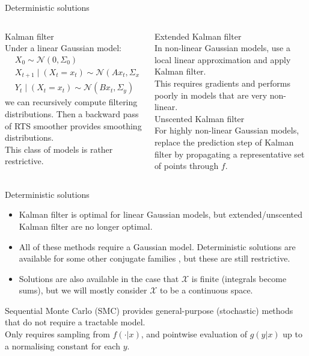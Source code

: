 \documentclass[aspectratio=169]{beamer}
\theoremstyle{definition}
\newcommand{\N}{\mathcal{N}}
\begin{document}
\begin{frame}{Deterministic solutions}
\begin{columns}
\begin{column}{0.45\textwidth}
{\Large Kalman filter \cite{kalman1960}}\\
Under a linear Gaussian model:
\begin{align*}
& X_0 \sim \N(0, \Sigma_0) \\
& X_{t+1} \mid (X_t = x_t) \sim \N(A x_t, \Sigma_x) \\
& Y_t \mid (X_t = x_t) \sim \N(B x_t, \Sigma_y)
\end{align*}
we can recursively compute filtering distributions. 
Then a backward pass of RTS smoother \cite{rauch1965} provides smoothing distributions.\\[7pt]
This class of models is rather restrictive.
\end{column}
\pause
\begin{column}{0.45\textwidth}
{\Large Extended Kalman filter \cite{jazwinski2007}}\\
In non-linear Gaussian models, use a local linear approximation and apply Kalman filter.\\[7pt]
This requires gradients and performs poorly in models that are very non-linear.\\[12pt]
\pause
{\Large Unscented Kalman filter \cite{wan2000}}\\
For highly non-linear Gaussian models, replace the prediction step of Kalman filter by propagating a representative set of points through $f$.
\end{column}
\end{columns}
\end{frame}

\begin{frame}{Deterministic solutions}
\begin{itemize}
\item Kalman filter is optimal for linear Gaussian models, but extended/unscented Kalman filter are no longer optimal.\\[7pt] %
\pause
\item All of these methods require a Gaussian model.
Deterministic solutions are available for some other conjugate families \cite{vidoni1999}, but these are still restrictive. \\[7pt]
\pause
\item Solutions are also available in the case that $\mathcal{X}$ is finite (integrals become sums), but we will mostly consider $\mathcal{X}$ to be a continuous space. \\[7pt]
\end{itemize}
\pause
Sequential Monte Carlo (SMC) provides general-purpose (stochastic) methods that do not require a tractable model.\\[7pt]
\pause 
Only requires sampling from $f(\cdot | x)$, and pointwise evaluation of $g(y | x)$ up to a normalising constant for each $y$.
\end{frame}
\end{document}
